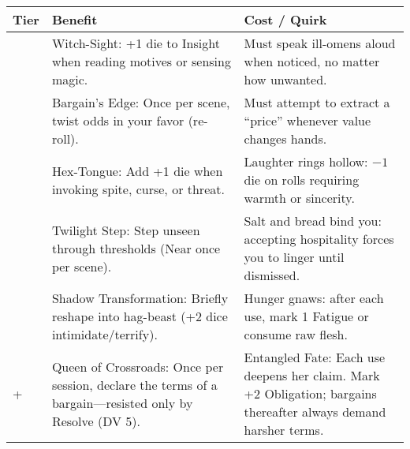 \begin{longtable}{>{\raggedright\arraybackslash}p{1cm} p{5cm} p{5cm}}
\toprule
\textbf{Tier} & \textbf{Benefit} & \textbf{Cost / Quirk} \\
\midrule
1 & Witch-Sight: +1 die to Insight when reading motives or sensing magic. & Must speak ill-omens aloud when noticed, no matter how unwanted. \\
\midrule
2 & Bargain’s Edge: Once per scene, twist odds in your favor (re-roll). & Must attempt to extract a “price” whenever value changes hands. \\
\midrule
3 & Hex-Tongue: Add +1 die when invoking spite, curse, or threat. & Laughter rings hollow: \(-1\) die on rolls requiring warmth or sincerity. \\
\midrule
4 & Twilight Step: Step unseen through thresholds (Near once per scene). & Salt and bread bind you: accepting hospitality forces you to linger until dismissed. \\
\midrule
5 & Shadow Transformation: Briefly reshape into hag-beast (+2 dice intimidate/terrify). & Hunger gnaws: after each use, mark 1 Fatigue or consume raw flesh. \\
\midrule
6+ & Queen of Crossroads: Once per session, declare the terms of a bargain—resisted only by Resolve (DV 5). & Entangled Fate: Each use deepens her claim. Mark +2 Obligation; bargains thereafter always demand harsher terms. \\
\bottomrule
\end{longtable}